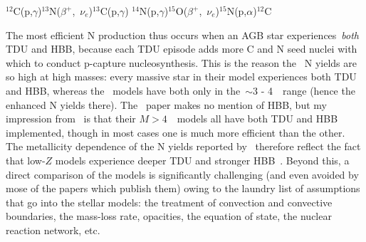 \documentclass[\main/notes.tex]{subfiles}
\begin{document}
\twolineskip 
$^{12}$C(p,$\gamma$)$^{13}$N($\beta^+$,~$\nu_e$)$^{13}$C(p,$\gamma$)\null 
$^{14}$N(p,$\gamma$)$^{15}$O($\beta^+$,~$\nu_e$)$^{15}$N(p,$\alpha$)$^{12}$C 

\twolineskip 
The most efficient N production thus occurs when an AGB star 
experiences~\textit{both} TDU and HBB, because each TDU episode adds more 
C and N seed nuclei with which to conduct p-capture nucleosynthesis. 
This is the reason the~\citet{Karakas2010} N yields are so high at high masses: 
every massive star in their model experiences both TDU and HBB, whereas 
the~\citet{Ventura2013} models have both only in the~$\sim$3 - 4~\msun~range 
(hence the enhanced N yields there). 
The~\citet{Cristallo2011} paper makes no mention of HBB, but my impression 
from~\citet{Cristallo2015} is that their $M > 4$~\msun~models all have both 
TDU and HBB implemented, though in most cases one is much more efficient than 
the other. 
The metallicity dependence of the N yields reported by~\citet{Karakas2010} 
therefore reflect the fact that low-$Z$ models experience deeper TDU and 
stronger HBB~\citep[see discussion in~\S~4.1 of][]{Ventura2013}. 
Beyond this, a direct comparison of the models is significantly challenging 
(and even avoided by mose of the papers which publish them) owing to the 
laundry list of assumptions that go into the stellar models: the treatment of 
convection and convective boundaries, the mass-loss rate, opacities, the 
equation of state, the nuclear reaction network, etc. 

\end{document}
